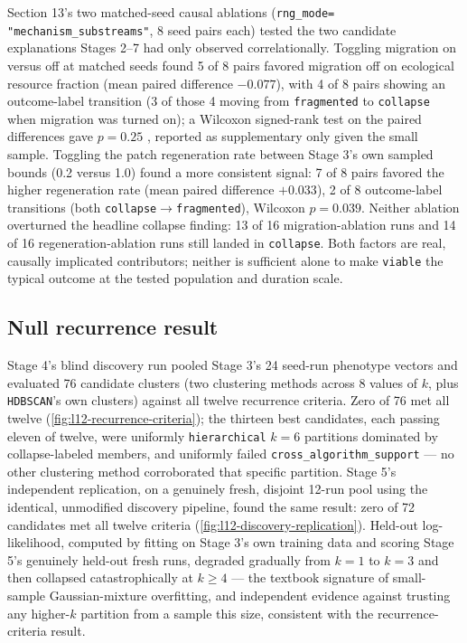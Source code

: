 Section 13's two matched-seed causal ablations (\texttt{rng\_mode=%
"mechanism\_substreams"}, 8 seed pairs each) tested the two candidate
explanations Stages 2--7 had only observed correlationally. Toggling
migration on versus off at matched seeds found 5 of 8 pairs favored
migration off on ecological resource fraction (mean paired difference
$-0.077$), with 4 of 8 pairs showing an outcome-label transition (3 of
those 4 moving from \texttt{fragmented} to \texttt{collapse} when migration
was turned on); a Wilcoxon signed-rank test on the paired differences gave
$p=0.25$ \parencite{wilcoxon1945individual}, reported as supplementary
only given the small sample. Toggling the patch regeneration rate between
Stage 3's own sampled bounds (0.2 versus 1.0) found a more consistent
signal: 7 of 8 pairs favored the higher regeneration rate (mean paired
difference $+0.033$), 2 of 8 outcome-label transitions (both
\texttt{collapse}$\to$\texttt{fragmented}), Wilcoxon $p=0.039$. Neither
ablation overturned the headline collapse finding: 13 of 16
migration-ablation runs and 14 of 16 regeneration-ablation runs still
landed in \texttt{collapse}. Both factors are real, causally implicated
contributors; neither is sufficient alone to make \texttt{viable} the
typical outcome at the tested population and duration scale.

\subsection{Null recurrence result}
\label{sec:level12-null}

Stage 4's blind discovery run pooled Stage 3's 24 seed-run phenotype
vectors and evaluated 76 candidate clusters (two clustering methods across
8 values of $k$, plus \texttt{HDBSCAN}'s own clusters) against all twelve
recurrence criteria. Zero of 76 met all twelve
(\cref{fig:l12-recurrence-criteria}); the thirteen best candidates, each
passing eleven of twelve, were uniformly \texttt{hierarchical} $k=6$
partitions dominated by collapse-labeled members, and uniformly failed
\texttt{cross\_algorithm\_support} --- no other clustering method
corroborated that specific partition. Stage 5's independent replication,
on a genuinely fresh, disjoint 12-run pool using the identical, unmodified
discovery pipeline, found the same result: zero of 72 candidates met all
twelve criteria (\cref{fig:l12-discovery-replication}). Held-out
log-likelihood, computed by fitting on Stage 3's own training data and
scoring Stage 5's genuinely held-out fresh runs, degraded gradually from
$k=1$ to $k=3$ and then collapsed catastrophically at $k\geq4$ --- the
textbook signature of small-sample Gaussian-mixture overfitting, and
independent evidence against trusting any higher-$k$ partition from a
sample this size, consistent with the recurrence-criteria result.

